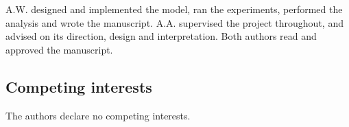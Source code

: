 A.W. designed and implemented the model, ran the experiments, performed the
analysis and wrote the manuscript. A.A. supervised the project throughout,
and advised on its direction, design and interpretation. Both authors read
and approved the manuscript.

\subsection*{Competing interests}

The authors declare no competing interests.

